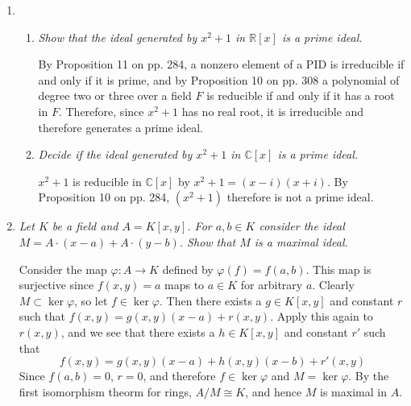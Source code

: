 \documentclass[10pt]{article}
\newcommand{\R}{\mathbb{R}}
\newcommand{\C}{\mathbb{C}}
\newcommand{\iso}{\cong}
\begin{document}
\begin{enumerate}
\begin{enumerate}
\end{enumerate}

\item
\begin{enumerate}
\item \emph{Show that the ideal generated by $x^2 + 1$ in $\R[x]$ is a prime ideal.}

By Proposition 11 on pp. 284, a nonzero element of a PID is irreducible if and only if it is prime, and by Proposition 10 on pp. 308 a polynomial of degree two or three over a field $F$ is reducible if and only if it has a root in $F$.  Therefore, since $x^2+1$ has no real root, it is irreducible and therefore generates a prime ideal.

\item \emph{Decide if the ideal generated by $x^2 + 1$ in $\C[x]$ is a prime ideal.}

$x^2+1$ is reducible in $\C[x]$ by $x^2+1 = (x-i)(x+i)$.  By Proposition 10 on pp. 284, $(x^2+1)$ therefore is not a prime ideal.

\end{enumerate}

\item \emph{Let $K$ be a field and $A = K[x,y]$.  For $a,b \in K$ consider the ideal $M = A \cdot (x-a) + A \cdot (y-b)$.  Show that $M$ is a maximal ideal.}


Consider the map $\varphi: A \rightarrow K$ defined by $\varphi(f) = f(a,b)$.  This map is surjective since $f(x,y) = a$ maps to $a \in K$ for arbitrary $a$. Clearly $M \subset \ker \varphi$, so let $f \in \ker \varphi$.  Then there exists a $g \in K[x,y]$ and constant $r$ such that $f(x,y) = g(x,y)(x-a) + r(x,y)$.  Apply this again to $r(x,y)$, and we see that there exists a $h \in K[x,y]$ and constant $r'$ such that $$f(x,y) = g(x,y)(x-a) + h(x,y)(x-b) + r'(x,y)$$  Since $f(a,b) = 0$, $r = 0$, and therefore $f \in \ker \varphi$ and $M = \ker \varphi$.  By the first isomorphism theorm for rings, $A/M \iso K$, and hence $M$ is maximal in $A$.

\end{enumerate}
\end{document}
